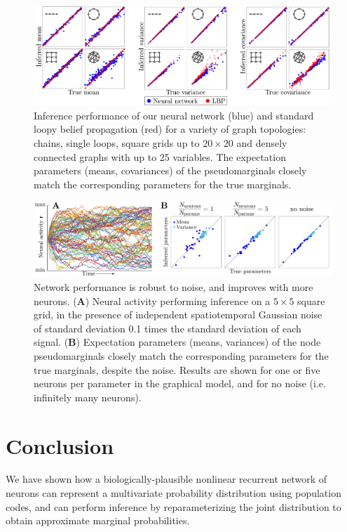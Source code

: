 \documentclass{article}
\begin{document}
 \begin{figure}[h]
 	\centering
 	\includegraphics[width=.95\textwidth]{Figures/Results4b_New.pdf}
 	\caption{Inference performance of our neural network (blue) and standard loopy belief propagation (red) for a variety of graph topologies: chains, single loops, square grids up to $20\times 20$ and densely connected graphs with up to 25 variables. The expectation parameters (means, covariances) of the pseudomarginals closely match the corresponding parameters for the true marginals.}
 	\label{fig:performance}
 \end{figure}
  
   
   \begin{figure}[h]
  	\centering
  	\includegraphics[width=1\textwidth]{Figures/Results8.pdf}
  	\caption{Network performance is robust to noise, and improves with more neurons. ({\bf A}) Neural activity performing inference on a $5\times 5$ square grid, in the presence of independent spatiotemporal Gaussian noise of standard deviation 0.1 times the standard deviation of each signal. ({\bf B}) Expectation parameters (means, variances) of the node pseudomarginals closely match the corresponding parameters for the true marginals, despite the noise. Results are shown for one or five neurons per parameter in the graphical model, and for no noise (i.e. infinitely many neurons).}
  	\label{fig:noiseperformance}
  \end{figure}

 \section{Conclusion}
 \label{Conclusion}
 
We have shown how a biologically-plausible nonlinear recurrent network of neurons can represent a multivariate probability distribution using population codes, and can perform inference by reparameterizing the joint distribution to obtain approximate marginal probabilities.
\end{document}
